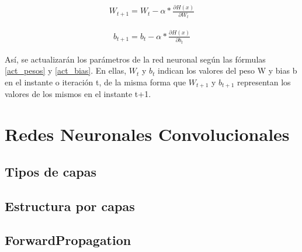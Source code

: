 \begin{gather}
	W_{t+1} = W_{t} - \alpha * \frac{\partial H(x)}{\partial W_{t}} 
	\label{act_pesos}
\end{gather}

\begin{gather}
	b_{t+1} = b_{t} - \alpha * \frac{\partial H(x)}{\partial b_{t}}
	\label{act_bias}
\end{gather}


Así, se actualizarán los parámetros de la red neuronal según las fórmulas \ref{act_pesos} y \ref{act_bias}. En ellas, $W_t$ y $b_t$ indican los valores del peso W y bias b en el instante o iteración t, de la misma forma que $W_{t+1}$ y $b_{t+1}$ representan los valores de los mismos en el instante t+1. \cite{SGD_act_params}


\section{Redes Neuronales Convolucionales}

\subsection{Tipos de capas}

\subsection{Estructura por capas}

\subsection{ForwardPropagation}
